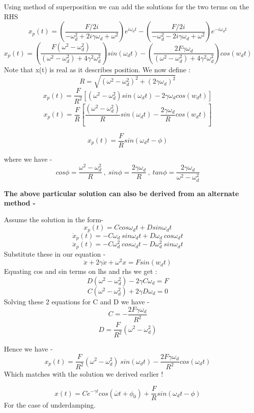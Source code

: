 \documentclass{book}
\begin{document}
Using method of superposition we can add the solutions for the two terms on the RHS 
\[ x_p(t)= \left( \frac{F/2i}{-\omega_d^2 + 2 i \gamma \omega_d + \omega^2} \right) e^{i\omega_d t} - \left( \frac{F/2i}{-\omega_d^2 - 2 i \gamma \omega_d + \omega^2} \right) e^{-i\omega_d t}\]
\[ x_p(t) = \left( \frac{F(\omega^2 - \omega_d^2)}{(\omega^2 - \omega_d^2) + 4\gamma^2 \omega_d^2} \right) sin(\omega_d t) - \left( \frac{2F\gamma \omega_d}{(\omega^2 - \omega_d^2) + 4\gamma^2 \omega_d^2} \right) cos(w_d t)\]
Note that x(t) is real as it describes position.
We now define :
\[ R = \sqrt{(\omega^2 - \omega_d^2)^2 + (2 \gamma \omega_d)^2}\]
\[x_p(t) = \frac{F}{R^2} \left[  (\omega^2 - \omega_d^2) sin(\omega_d t) - 2 \gamma \omega_d cos(w_d t)\right] \]
\[ x_p(t) = \frac{F}{R} \left[  \frac{(\omega^2 - \omega_d^2)}{R} sin(\omega_d t) - \frac{2 \gamma \omega_d}{R} cos(w_d t)\right] \]
\begin{tcolorbox}[colback=pink!30!white, colframe=black, width=\textwidth, boxrule=0.5mm, sharp corners, left=1mm, right=1mm, top=1mm, bottom=1mm]
    \[ x_p(t) = \frac{F}{R} sin(\omega_d t - \phi)\] 
\end{tcolorbox}
where we have - 
\[ cos \phi = \frac{\omega^2 - \omega_d^2}{R} \ , \ sin \phi = \frac{2 \gamma \omega_d}{R} \ , \ tan \phi = \frac{2 \gamma \omega_d}{\omega^2 - \omega_d^2}\]

\noindent
\textbf{The above particular solution can also be derived from an alternate method - }

Assume the solution in the form-
\[ x_p(t) = C cos \omega_d t + D sin \omega_d t \] 
\[ \dot{x}_p(t)= -C\omega_d \ sin \omega_d t + D \omega_d \ cos \omega_d t \]
\[ \ddot{x}_p(t) = - C \omega_d^2 \ cos \omega_d t - D \omega_d^2 \ sin \omega_d t\]
Substitute these in our equation - 
\[ \ddot{x} + 2\gamma \dot{x} + \omega^2 x = F sin(w_d t)\]
\noindent
Equating cos and sin terms on lhs and rhs we get :
\[ D( \omega^2 - \omega_d^2) - 2\gamma C \omega_d = F\] 
\[ C (\omega^2 - \omega_d^2) +2 \gamma D \omega_d =0\] 
Solving these 2 equations for C and D we have - 
\[ C = - \frac{2 F \gamma \omega_d }{R^2}\] 
\[ D = \frac{F}{R^2} ( \omega^2 - \omega_d^2) \]

Hence we have - 
\[ x_p(t) =  \frac{F}{R^2} ( \omega^2 - \omega_d^2)\ sin (\omega_d t)  - \frac{2 F \gamma \omega_d }{R^2} cos (\omega_d t)\]
Which matches with the solution we derived earlier !

\begin{tcolorbox}[colback=pink!30!white, colframe=black, width=\textwidth, boxrule=0.5mm, sharp corners, left=1mm, right=1mm, top=1mm, bottom=1mm]
\[ x(t)= C e^{-\gamma t} cos(\overline{\omega} t + \phi_0) + \frac{F}{R} sin(\omega_d t - \phi)\]
For the case of underdamping.
\end{tcolorbox}
\end{document}

